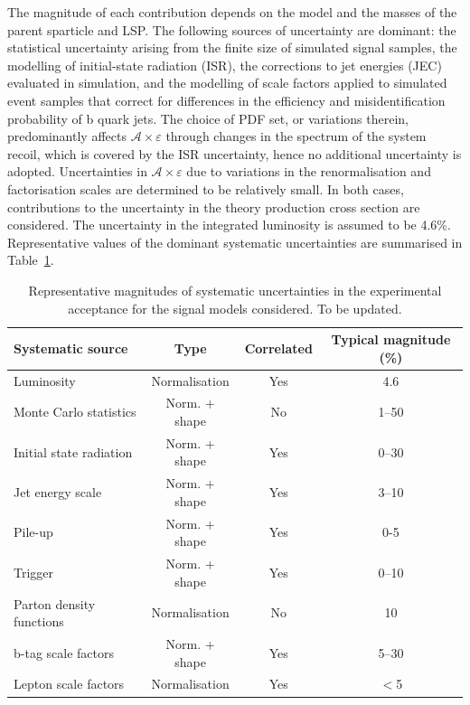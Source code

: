 The magnitude of each contribution depends on the model and the masses
of the parent sparticle and LSP. The following sources of uncertainty
are dominant: the statistical uncertainty arising from the finite size
of simulated signal samples, the modelling of initial-state radiation
(ISR), the corrections to jet energies (JEC) evaluated in simulation,
and the modelling of scale factors applied to simulated event samples
that correct for differences in the efficiency and misidentification
probability of b quark jets. The choice of PDF set, or variations
therein, predominantly affects $\mathcal{A}\times\varepsilon$ through
changes in the \Pt spectrum of the system recoil, which is covered by
the ISR uncertainty, hence no additional uncertainty is
adopted. Uncertainties in $\mathcal{A}\times\varepsilon$ due to
variations in the renormalisation and factorisation scales are
determined to be relatively small. In both cases, contributions to the
uncertainty in the theory production cross section are considered. The
uncertainty in the integrated luminosity is assumed to be
4.6\%. Representative values of the dominant systematic uncertainties
are summarised in Table~\ref{tab:signal_systs}.

\begin{table}[h!]
  \caption{
    Representative magnitudes of systematic uncertainties in the
    experimental acceptance for the signal models considered. 
    {\color{red} To be updated. } 
  }
  \label{tab:signal_systs}
  \centering
  \footnotesize
  \begin{tabular}{ lccc }
    \hline
    \hline
    Systematic source              & Type          & Correlated & Typical magnitude (\%) \\
    \hline
    Luminosity                     & Normalisation & Yes        & 4.6                    \\
    Monte Carlo statistics         & Norm. + shape & No         & 1--50                  \\
    Initial state radiation        & Norm. + shape & Yes        & 0--30                  \\
    Jet energy scale               & Norm. + shape & Yes        & 3--10                  \\
    Pile-up                        & Norm. + shape & Yes        & 0-5                    \\
    Trigger                        & Norm. + shape & Yes        & 0--10                  \\
    Parton density functions       & Normalisation & No         & 10                     \\
    b-tag scale factors            & Norm. + shape & Yes        & 5--30                  \\
    Lepton scale factors           & Normalisation & Yes        & $<$5                   \\
    \hline
    \hline
  \end{tabular}
\end{table}
  
